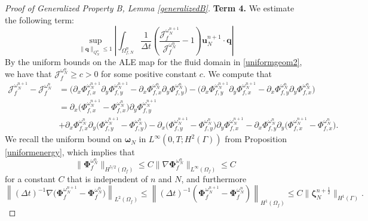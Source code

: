 \documentclass[11pt]{article}
\newcommand{\bd}{\boldsymbol}
\theoremstyle{definition}
\begin{document}
\begin{proof}[Proof of Generalized Property B, Lemma \ref{generalizedB}]
\noindent \textbf{Term 4.} We estimate the following term:
\begin{equation*}
\sup_{\|\bd{q}\|_{Q^{n}_{N}} \le 1} \left|\int_{\Omega^{n}_{f, N}} \frac{1}{\Delta t} \left(\frac{\mathcal{J}^{\omega^{n + 1}_{N}}_{f}}{\mathcal{J}^{\omega^{n}_{N}}_{f}} - 1\right) \bd{u}^{n + 1}_{N} \cdot \bd{q}\right|
\end{equation*}
By the uniform bounds on the ALE map for the fluid domain in \eqref{uniformgeom2}, we have that $\mathcal{J}^{\omega^{n}_{N}}_{f} \ge c > 0$ for some positive constant $c$. We compute that
\begin{align*}
\mathcal{J}^{\omega^{n + 1}_{N}}_{f} - \mathcal{J}^{\omega^{n}_{N}}_{f} &= \Big(\partial_{x}\Phi^{\omega^{n + 1}_{N}}_{f, x} \partial_{y} \Phi^{\omega^{n + 1}_{N}}_{f, y} - \partial_{x} \Phi^{\omega^{n}_{N}}_{f, x} \partial_{y} \Phi^{\omega^{n}_{N}}_{f, y}\Big) - \Big(\partial_{x}\Phi^{\omega^{n + 1}_{N}}_{f, y}\partial_{y}\Phi^{\omega^{n + 1}_{N}}_{f, x} - \partial_{x}\Phi^{\omega^{n}_{N}}_{f, y} \partial_{y} \Phi^{\omega^{n}_{N}}_{f, x}\Big) \\
&= \partial_{x}\Big(\Phi^{\omega^{n + 1}_{N}}_{f, x} - \Phi^{\omega^{n}_{N}}_{f, x}\Big) \partial_{y}\Phi^{\omega^{n + 1}_{N}}_{f, y} \\
&+ \partial_{x}\Phi^{\omega^{n}_{N}}_{f, x} \partial_{y}\Big(\Phi^{\omega^{n + 1}_{N}}_{f, y} - \Phi^{\omega^{n}_{N}}_{f, y}\Big) - \partial_{x}\Big(\Phi^{\omega^{n + 1}_{N}}_{f, y} - \Phi^{\omega^{n}_{N}}_{f, y}\Big) \partial_{y}\Phi^{\omega^{n + 1}_{N}}_{f, x} - \partial_{x}\Phi^{\omega^{n}_{N}}_{f, y} \partial_{y} \Big(\Phi^{\omega^{n + 1}_{N}}_{f, x} - \Phi^{\omega^{n}_{N}}_{f, x}\Big).
\end{align*}
We recall the uniform bound on $\bd{\omega}_{N}$ in $L^{\infty}(0, T; H^{2}(\Gamma))$ from Proposition \ref{uniformenergy}, which implies that 
\begin{equation*}
\|\bd{\Phi}^{\omega^{n}_{N}}_{f}\|_{H^{5/2}(\Omega_{f})} \le C\|\nabla \bd{\Phi}^{\omega^{n}_{N}}_{f}\|_{L^{\infty}(\Omega_{f})} \le C
\end{equation*}
for a constant $C$ that is independent of $n$ and $N$, and furthermore
\begin{equation*}
\left\|(\Delta t)^{-1} \nabla \Big(\bd{\Phi}^{\omega^{n + 1}_{N}}_{f} - \bd{\Phi}^{\omega^{n}_{N}}_{f}\Big)\right\|_{L^{2}(\Omega_{f})} \le \left\|(\Delta t)^{-1} (\bd{\Phi}^{\omega^{n + 1}_{N}}_{f} - \bd{\Phi}^{\omega^{n}_{N}}_{f})\right\|_{H^{1}(\Omega_{f})} \le C\|\bd{\zeta}^{n + \frac{1}{2}}_{N}\|_{H^{1}(\Gamma)}.
\end{equation*}

\end{proof}
\end{document}
